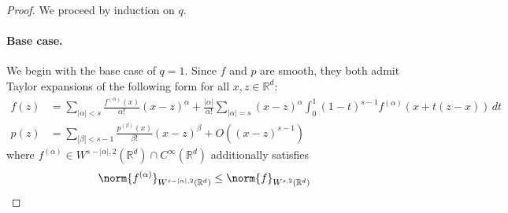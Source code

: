 \documentclass{article}
\newcommand{\Reals}{\mathbb{R}}
\newcommand{\abs}[1]{\left \lvert #1 \right \rvert}
\newcommand{\1}{\mathbf{1}}
\newcommand{\Rd}{\Reals^d}
\theoremstyle{alden}
\theoremstyle{aldenthm}
\theoremstyle{definition}
\theoremstyle{remark}
\begin{document}
\begin{proof}	
	We proceed by induction on $q$. 
	\paragraph{Base case.}
	We begin with the base case of $q = 1$. Since $f$ and $p$ are smooth, they both admit Taylor expansions of the following form for all $x,z \in \Rd$:
	\begin{align*}
	f(z) & = \sum_{\abs{\alpha} < s} \frac{f^{(\alpha)}(x)}{\alpha!} (x - z)^{\alpha} + \frac{\abs{\alpha}}{\alpha!}\sum_{\abs{\alpha} = s} (x - z)^{\alpha} \int_{0}^{1}(1 - t)^{s - 1} f^{(\alpha)}(x + t(z - x)) \,dt\\
	p(z) & = \sum_{\abs{\beta} < s  - 1} \frac{p^{(\beta)}(x)}{\beta!} (x - z)^{\beta} + O((x - z)^{s - 1})
	\end{align*}
	where $f^{(\alpha)} \in W^{s - \abs{\alpha},2}(\Rd) \cap C^{\infty}(\Rd)$ additionally satisfies
	\begin{equation*}
	\norm{f^{(\alpha)}}_{W^{s - \abs{\alpha},2}(\Rd)} \leq \norm{f}_{W^{s,2}(\Rd)}
	\end{equation*}
	

\end{proof}
\end{document}
